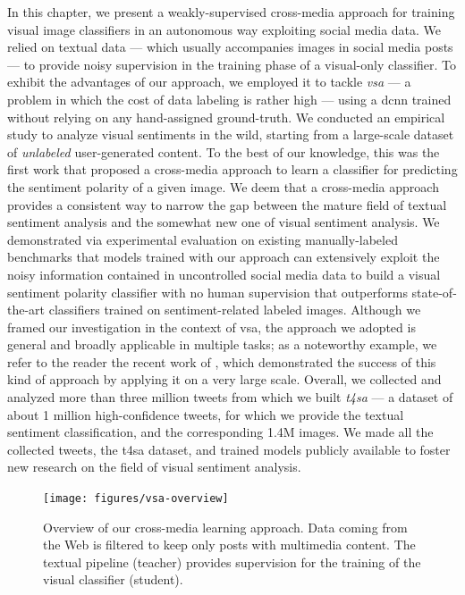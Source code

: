 In this chapter, we present a weakly-supervised cross-media approach for training visual image classifiers in an autonomous way exploiting social media data.
We relied on textual data --- which usually accompanies images in social media posts --- to provide noisy supervision in the training phase of a visual-only classifier.
To exhibit the advantages of our approach, we employed it to tackle \emph{\gls{vsa}} --- a problem in which the cost of data labeling is rather high --- using a \acrfull{dcnn} trained without relying on any hand-assigned ground-truth.
We conducted an empirical study to analyze visual sentiments in the wild, starting from a large-scale dataset of \emph{unlabeled} user-generated content.
To the best of our knowledge, this was the first work that proposed a cross-media approach to learn a classifier for predicting the sentiment polarity of a given image.
We deem that a cross-media approach provides a consistent way to narrow the gap between the mature field of textual sentiment analysis and the somewhat new one of visual sentiment analysis.
We demonstrated via experimental evaluation on existing manually-labeled benchmarks that models trained with our approach can extensively exploit the noisy information contained in uncontrolled social media data to build a visual sentiment polarity classifier with no human supervision that outperforms state-of-the-art classifiers trained on sentiment-related labeled images.
Although we framed our investigation in the context of \gls{vsa}, the approach we adopted is general and broadly applicable in multiple tasks;
as a noteworthy example, we refer to the reader the recent work of \citet{mahajan2018exploring}, which demonstrated the success of this kind of approach by applying it on a very large scale.
Overall, we collected and analyzed more than three million tweets from which we built \emph{\acrfull{t4sa}} --- a dataset of about 1 million high-confidence tweets, for which we provide the textual sentiment classification, and the corresponding 1.4M images.
We made all the collected tweets, the \gls{t4sa} dataset, and trained models publicly available to foster new research on the field of visual sentiment analysis.

\begin{figure}
    \centering
    \texttt{[image: figures/vsa-overview]}
    \caption{Overview of our cross-media learning approach.
    Data coming from the Web is filtered to keep only posts with multimedia content.
    The textual pipeline (teacher) provides supervision for the training of the visual classifier (student).}
    \label{fig:vsa:overview}
\end{figure}

